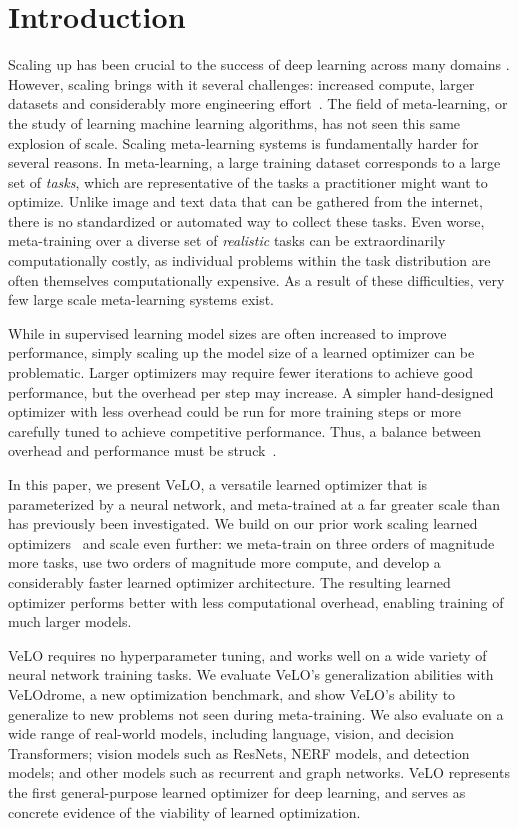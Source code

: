 \documentclass[11pt]{article}
\begin{document}
\section{Introduction}
Scaling up has been crucial to the success of deep learning across many domains \citep{krizhevsky2012imagenet, hannun2014deep,radford2018improving, radford2019language, brown2020language, devlin2018bert}.
However, scaling brings with it several challenges: increased compute, larger datasets and considerably more engineering effort~\citep{zhang2022opt, barham2022pathways}. 
The field of meta-learning, or the study of learning machine learning algorithms, has not seen this same explosion of scale.
Scaling meta-learning systems is fundamentally harder for several reasons.
In meta-learning, a large training dataset corresponds to a large set of \emph{tasks}, which are representative of the tasks a practitioner might want to optimize. 
Unlike image and text data that can be gathered from the internet, there is no standardized or automated way to collect these tasks. 
Even worse, meta-training over a diverse set of \emph{realistic} tasks can be extraordinarily computationally costly, as individual problems within the task distribution are often themselves computationally expensive.
As a result of these difficulties, very few large scale meta-learning systems exist.

While in supervised learning model sizes are often increased to improve performance, simply scaling up the model size of a learned optimizer can be problematic.
Larger optimizers may require fewer iterations to achieve good performance, but the overhead per step may increase. A simpler hand-designed optimizer with less overhead could be run for more training steps or more carefully tuned to achieve competitive performance.
Thus, a balance between overhead and performance must be struck~\citep{metz2022practical}.

In this paper, we present VeLO, a versatile learned optimizer that is parameterized by a neural network, and meta-trained at a far greater scale than has previously been investigated. 
We build on our prior work scaling learned optimizers~\citep{metz2020tasks} and scale even further: we meta-train on three orders of magnitude more tasks, use two orders of magnitude more compute, and develop a considerably faster learned optimizer architecture.
The resulting learned optimizer performs better with less computational overhead, enabling training of much larger models.

VeLO requires no hyperparameter tuning, and works well on a wide variety of neural network training tasks. 
We evaluate VeLO's generalization abilities with VeLOdrome, a new optimization benchmark, and show VeLO's ability to generalize to new problems not seen during meta-training. 
We also evaluate on a wide range of real-world models, including language, vision, and decision Transformers; vision models such as ResNets, NERF models, and detection models; and other models such as recurrent and graph networks. 
VeLO represents the first general-purpose learned optimizer for deep learning, and serves as concrete evidence of the viability of learned optimization.
\end{document}
